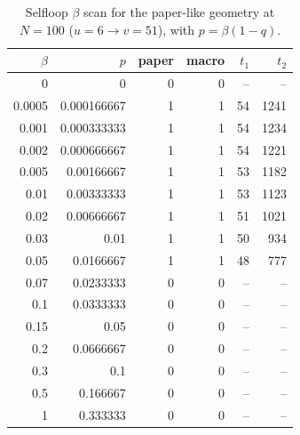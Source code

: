 \begin{table}[!htbp]
\centering
\small
\begin{tabular}{rrrrrr}
\toprule
$\beta$ & $p$ & paper & macro & $t_1$ & $t_2$\\
\midrule
0 & 0 & 0 & 0 & -- & --\\
0.0005 & 0.000166667 & 1 & 1 & 54 & 1241\\
0.001 & 0.000333333 & 1 & 1 & 54 & 1234\\
0.002 & 0.000666667 & 1 & 1 & 54 & 1221\\
0.005 & 0.00166667 & 1 & 1 & 53 & 1182\\
0.01 & 0.00333333 & 1 & 1 & 53 & 1123\\
0.02 & 0.00666667 & 1 & 1 & 51 & 1021\\
0.03 & 0.01 & 1 & 1 & 50 & 934\\
0.05 & 0.0166667 & 1 & 1 & 48 & 777\\
0.07 & 0.0233333 & 0 & 0 & -- & --\\
0.1 & 0.0333333 & 0 & 0 & -- & --\\
0.15 & 0.05 & 0 & 0 & -- & --\\
0.2 & 0.0666667 & 0 & 0 & -- & --\\
0.3 & 0.1 & 0 & 0 & -- & --\\
0.5 & 0.166667 & 0 & 0 & -- & --\\
1 & 0.333333 & 0 & 0 & -- & --\\
\bottomrule
\end{tabular}
\caption{Selfloop $\beta$ scan for the paper-like geometry at $N=100$ ($u=6\to v=51$), with $p=\beta(1-q)$. }
\label{tab:selfloop-beta-scan-en}
\end{table}
